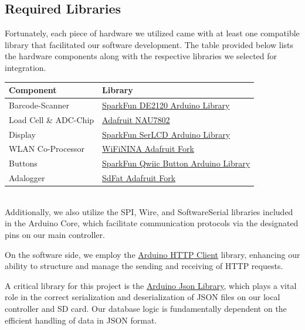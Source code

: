 \documentclass{article}
\begin{document}
\subsection{Required Libraries}
Fortunately, each piece of hardware we utilized came with at least one compatible library that facilitated our software development. The table provided below lists the hardware components along with the respective libraries we selected for integration.
\\[10pt]

\begin{tabular}{l l}
	\hline
	Component             & Library                                                                                                         \\
	\hline
	Barcode-Scanner       & \href{https://github.com/sparkfun/SparkFun_DE2120_Arduino_Library}{SparkFun DE2120 Arduino Library}             \\
	Load Cell \& ADC-Chip & \href{https://github.com/adafruit/Adafruit_NAU7802}{Adafruit NAU7802}                                           \\
	Display               & \href{https://github.com/sparkfun/SparkFun_SerLCD_Arduino_Library}{SparkFun SerLCD Arduino Library}             \\
	WLAN Co-Processor     & \href{https://github.com/adafruit/WiFiNINA}{WiFiNINA Adafruit Fork}                                             \\
	Buttons               & \href{https://github.com/sparkfun/SparkFun_Qwiic_Button_Arduino_Library}{SparkFun Qwiic Button Arduino Library} \\
	Adalogger             & \href{https://github.com/adafruit/SdFat}{SdFat Adafruit Fork}                                                   \\
	\hline
\end{tabular} \\[10pt]

Additionally, we also utilize the SPI, Wire, and SoftwareSerial libraries included in the Arduino Core, which facilitate communication protocols via the designated pins on our main controller.

On the software side, we employ the \href{https://github.com/arduino-libraries/ArduinoHttpClient}{Arduino HTTP Client} library, enhancing our ability to structure and manage the sending and receiving of HTTP requests.

A critical library for this project is the \href{https://github.com/bblanchon/ArduinoJson}{Arduino Json Library}, which plays a vital role in the correct serialization and deserialization of JSON files on our local controller and SD card. Our database logic is fundamentally dependent on the efficient handling of data in JSON format.
\end{document}
